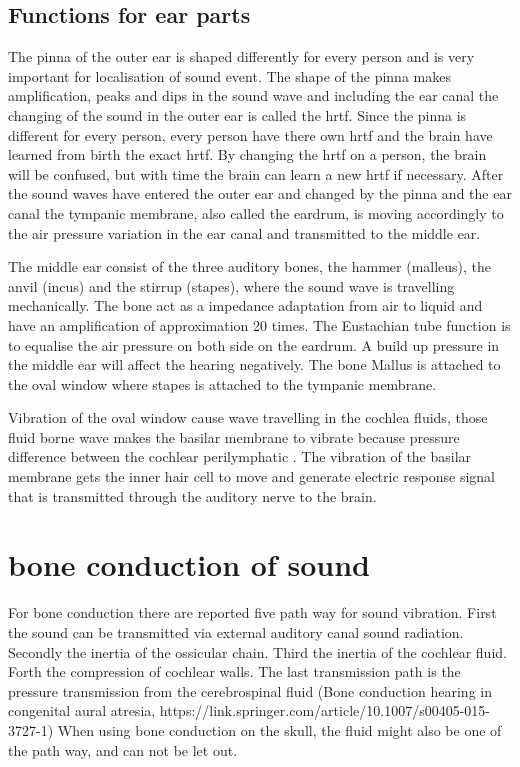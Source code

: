 \subsection{Functions for ear parts}
The pinna of the outer ear is shaped differently for every person and is very important for localisation of sound event. The shape of the pinna makes amplification, peaks and dips in the sound wave and including the ear canal the changing of the sound in the outer ear is called the \gls{hrtf}. Since the pinna is different for every person, every person have there own \gls{hrtf} and the brain have learned from birth the exact \gls{hrtf}. By changing the \gls{hrtf} on a person, the brain will be confused, but with time the brain can learn a new \gls{hrtf} if necessary. After the sound waves have entered the outer ear and changed by the pinna and the ear canal the tympanic membrane, also called the eardrum, is moving accordingly to the air pressure variation in the ear canal and transmitted to the middle ear.  

The middle ear consist of the three auditory bones, the hammer (malleus), the anvil (incus) and the stirrup (stapes), where the sound wave is travelling mechanically. The bone act as a impedance adaptation from air to liquid and have an amplification of approximation 20 times. The Eustachian tube function is to equalise the air pressure on both side on the eardrum. A build up pressure in the middle ear will affect the hearing negatively. The bone Mallus is attached to the oval window where stapes is attached to the tympanic membrane.

Vibration of the oval window cause wave travelling in the cochlea fluids, those fluid borne wave makes the basilar membrane to vibrate because pressure difference between the cochlear perilymphatic \citep{ho_2017}. The vibration of the basilar membrane gets the inner hair cell to move and generate electric response signal that is transmitted through the auditory nerve to the brain.



\section{bone conduction of sound}

For bone conduction there are reported five path way for sound vibration. First the sound can be transmitted via external auditory canal sound radiation. Secondly the inertia of the ossicular chain. Third the inertia of the cochlear fluid. Forth the compression of cochlear walls. The last transmission path is the pressure transmission from the cerebrospinal fluid (Bone conduction hearing in congenital aural atresia, https://link.springer.com/article/10.1007/s00405-015-3727-1) When using bone conduction on the skull, the fluid might also be one of the path way, and can not be let out. 

